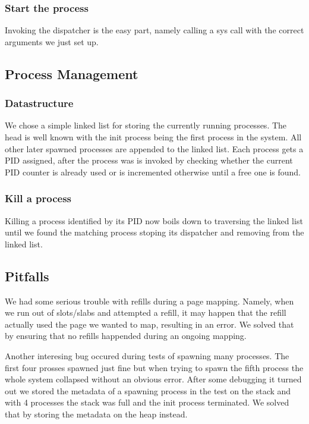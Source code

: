 \subsubsection{Start the process}
Invoking the dispatcher is the easy part, namely calling a sys call with the correct arguments we just set up.

\subsection{Process Management}

\subsubsection{Datastructure}
We chose a simple linked list for storing the currently running processes. The head is well known with the init process being the first process in the system.
All other later spawned processes are appended to the linked list.
Each process gets a PID assigned, after the process was is invoked by checking whether the current PID counter is already used or is incremented otherwise until a free one is found.

\subsubsection{Kill a process}
Killing a process identified by its PID now boils down to traversing the linked list until we found the matching process stoping its dispatcher and removing from the linked list.


\subsection{Pitfalls}
We had some serious trouble with refills during a page mapping. Namely, when we run out of slots/slabs and attempted a refill, it may happen that the refill actually used the page we wanted to map, resulting in an error. We solved that by ensuring that no refills happended during an ongoing mapping.

Another interesing bug occured during tests of spawning many processes. The first four prosses spawned just fine but when trying to spawn the fifth process the whole system collapsed without an obvious error. After some debugging it turned out we stored the metadata of a spawning process in the test on the stack and with 4 processes the stack was full and the init process terminated. We solved that by storing the metadata on the heap instead.

